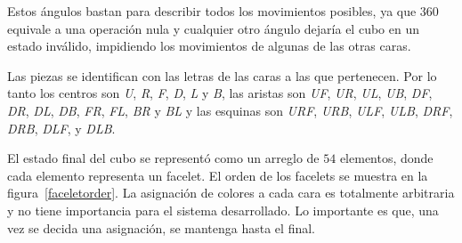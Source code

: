 Estos ángulos bastan para describir todos los movimientos posibles, ya que $360$ equivale a una operación nula y cualquier otro ángulo dejaría el cubo en un estado inválido, impidiendo los movimientos de algunas de las otras caras.

Las piezas se identifican con las letras de las caras a las que pertenecen. Por lo tanto los centros son \textit{U}, \textit{R}, \textit{F}, \textit{D}, \textit{L} y \textit{B}, las aristas son \textit{UF}, \textit{UR}, \textit{UL}, \textit{UB}, \textit{DF}, \textit{DR}, \textit{DL}, \textit{DB}, \textit{FR}, \textit{FL}, \textit{BR} y \textit{BL} y las esquinas son \textit{URF}, \textit{URB}, \textit{ULF}, \textit{ULB}, \textit{DRF}, \textit{DRB}, \textit{DLF}, y \textit{DLB}.

El estado final del cubo se representó como un arreglo de $54$ elementos, donde cada elemento representa un facelet. El orden de los facelets se muestra en la figura~\ref{faceletorder}.
La asignación de colores a cada cara es totalmente arbitraria y no tiene importancia para el sistema desarrollado. Lo importante es que, una vez se decida una asignación, se mantenga hasta el final.


